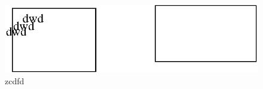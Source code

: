 \documentclass[12pt,a4paper,final,oneside]{report}
\begin{document}
\begin{figure}
\includegraphics[scale=1]{winfig1.eps} 
\caption{zcdfd}
\end{figure}
\end{document}
